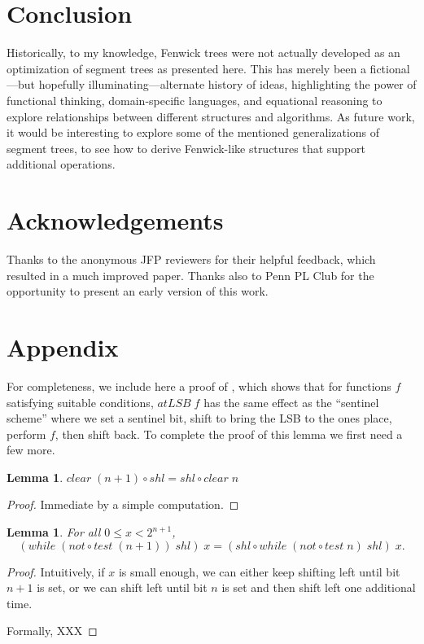 \documentclass{jfp}
\newcommand{\Varid}[1]{\mathit{#1}}
\renewcommand{\leq}{\leqslant}
\providecommand{\pref}{}
\renewcommand{\pref}[1]{\prettyref{#1}}
\newtheorem{lem}[thm]{Lemma}
\theoremstyle{definition}
\theoremstyle{remark}
\begin{document}
\section{Conclusion}

Historically, to my knowledge, Fenwick trees were not actually
developed as an optimization of segment trees as presented here.  This
has merely been a fictional---but hopefully illuminating---alternate
history of ideas, highlighting the power of functional thinking,
domain-specific languages, and equational reasoning to explore
relationships between different structures and algorithms.  As future
work, it would be interesting to explore some of the mentioned
generalizations of segment trees, to see how to derive Fenwick-like
structures that support additional operations.

\section*{Acknowledgements}

Thanks to the anonymous JFP reviewers for their helpful feedback,
which resulted in a much improved paper.  Thanks also to Penn PL
Club for the opportunity to present an early version of this work.




\section*{Appendix}

For completeness, we include here a proof of
\pref{lem:sentinel-scheme}, which shows that for functions $f$
satisfying suitable conditions, \ensuremath{\Varid{atLSB}\;\Varid{f}} has the same effect as the
``sentinel scheme'' where we set a sentinel bit, shift to bring the
LSB to the ones place, perform $f$, then shift back.  To complete the
proof of this lemma we first need a few more.

\begin{lem} \label{lem:clearshl}
  \ensuremath{\Varid{clear}\;(\Varid{n}\mathbin{+}\mathrm{1})\mathbin{\circ}\Varid{shl}\mathrel{=}\Varid{shl}\mathbin{\circ}\Varid{clear}\;\Varid{n}}
\end{lem}
\begin{proof}
  Immediate by a simple computation.
\end{proof}

\begin{lem} \label{lem:shlwhile}
 For all $0 \leq x < 2^{n+1}$, \[ \ensuremath{(\Varid{while}\;(not\mathbin{\circ}\Varid{test}\;(\Varid{n}\mathbin{+}\mathrm{1}))\;\Varid{shl})\;\Varid{x}\mathrel{=}(\Varid{shl}\mathbin{\circ}\Varid{while}\;(not\mathbin{\circ}\Varid{test}\;\Varid{n})\;\Varid{shl})\;\Varid{x}}. \]
\end{lem}
\begin{proof}
  Intuitively, if $x$ is small enough, we can either keep shifting
  left until bit $n+1$ is set, or we can shift left until bit $n$ is
  set and then shift left one additional time.

  Formally, XXX
\end{proof}
\end{document}
